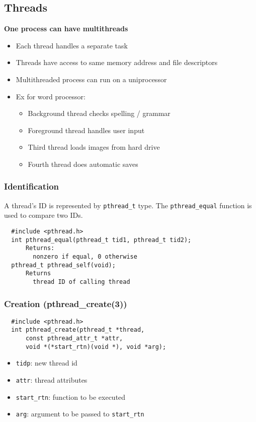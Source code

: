 \documentclass[10pt]{article}
\begin{document}
\begin{multicols}{2}
\begin{minipage}{\columnwidth}
        \subsection*{Threads}
        \textbf{One process can have multithreads}
        \begin{itemize}
            \item Each thread handles a separate task
            \item Threads have access to same memory address and file descriptors
            \item Multithreaded process can run on a uniprocessor
            \item Ex for word processor:
                  \begin{itemize}
                      \item Background thread checks spelling / grammar
                      \item Foreground thread handles user input
                      \item Third thread loads images from hard drive
                      \item Fourth thread does automatic saves
                  \end{itemize}
        \end{itemize}
        \subsubsection*{Identification}
        A thread's ID is represented by \texttt{pthread\_t} type.
        The \texttt{pthread\_equal} function is used to compare two IDs.

        \begin{lstlisting}
  #include <pthread.h>
  int pthread_equal(pthread_t tid1, pthread_t tid2);
      Returns:
        nonzero if equal, 0 otherwise
  pthread_t pthread_self(void);
      Returns
        thread ID of calling thread
          \end{lstlisting}
        \subsubsection*{Creation (pthread\_create(3))}
        \begin{lstlisting}
  #include <pthread.h>
  int pthread_create(pthread_t *thread,
      const pthread_attr_t *attr,
      void *(*start_rtn)(void *), void *arg);
        \end{lstlisting}
        \begin{itemize}
            \setlength{\itemsep}{0em}
            \item \texttt{tidp}: new thread id
            \item \texttt{attr}: thread attributes
            \item \texttt{start\_rtn}: function to be executed
            \item \texttt{arg}: argument to be passed to \texttt{start\_rtn}
        \end{itemize}

\end{minipage}
\end{multicols}
\end{document}
